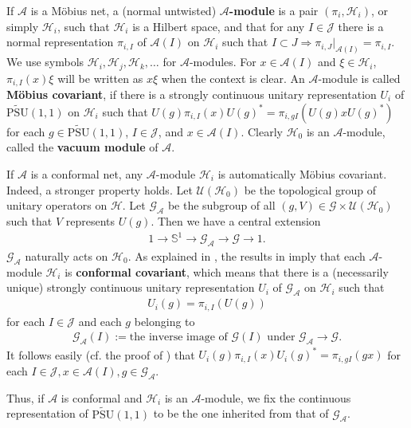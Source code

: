 \documentclass[11pt,b5paper,notitlepage]{article}
\theoremstyle{definition}
\theoremstyle{plain}
\newcommand{\mc}{\mathcal}
\newcommand{\GA}{\mathscr G_{\mathcal A}}
\newcommand{\scr}{\mathscr}
\newcommand{\UPSU}{\widetilde{\mathrm{PSU}}(1,1)}
\newcommand{\Sbb}{{\mathbb S}}
\numberwithin{equation}{section}
\begin{document}
If $\mc A$ is a M\"obius net, a (normal untwisted) \textbf{$\mc A$-module} is a pair $(\pi_i,\mc H_i)$, or simply $\mc H_i$, such that $\mc H_i$ is a Hilbert space, and that for any $I\in\mc J$ there is a normal  representation $\pi_{i,I}$ of $\mc A(I)$ on $\mc H_i$ such that $I\subset J\Rightarrow \pi_{i,J}|_{\mc A(I)}=\pi_{i,I}$. We use symbols $\mc H_i,\mc H_j,\mc H_k,\dots$ for $\mc A$-modules. For $x\in\mc A(I)$ and $\xi\in\mc H_i$, $\pi_{i,I}(x)\xi$ will be written as $x\xi$ when the context is clear. An $\mc A$-module is called \textbf{M\"obius covariant}, if there is a strongly continuous unitary representation $U_i$ of $\UPSU$ on $\mc H_i$ such that $U(g)\pi_{i,I}(x)U(g)^*=\pi_{i,gI}(U(g)xU(g)^*)$ for each $g\in\UPSU$, $I\in\mc J$, and $x\in\mc A(I)$. Clearly $\mc H_0$ is an $\mc A$-module, called the \textbf{vacuum module} of $\mc A$.

If $\mc A$ is a conformal net, any $\mc A$-module $\mc H_i$ is automatically M\"obius covariant. Indeed, a stronger property holds. Let $\mc U(\mc H_0)$ be the topological group of unitary operators on $\mc H$. Let $\GA$ be the subgroup of all $(g,V)\in\scr G\times\mc U(\mc H_0)$ such that $V$ represents $U(g)$. Then we have a central extension
\begin{align*}
	1\rightarrow \Sbb^1\rightarrow \GA\rightarrow\scr G\rightarrow 1.
\end{align*}
$\GA$ naturally acts on $\mc H_0$. As explained in \cite[Thm. 2.2]{Gui21a}, the results in \cite{Hen19} imply that   each $\mc A$-module $\mc H_i$ is \textbf{conformal covariant}, which means that there is a (necessarily unique) strongly continuous unitary representation $U_i$ of $\GA$ on $\mc H_i$ such that
\begin{align}
U_i(g)=\pi_{i,I}(U(g))	\label{eq1}
\end{align}
for each $I\in\mc J$ and each $g$ belonging to 
\begin{align*}
\GA(I):=\text{the inverse image of $\scr G(I)$ under $\GA\rightarrow\scr G$}.	
\end{align*}
It follows easily (cf. the proof of \cite[Cor. 2.6]{Gui21a}) that   $U_i(g)\pi_{i,I}(x)U_i(g)^*=\pi_{i,gI}(gx)$ for each $I\in\mc J,x\in\mc A(I),g\in\GA$.
 

Thus, if $\mc A$ is conformal and $\mc H_i$ is an $\mc A$-module, we fix the continuous representation of $\UPSU$ to be the one inherited from that of $\GA$.  
\end{document}
